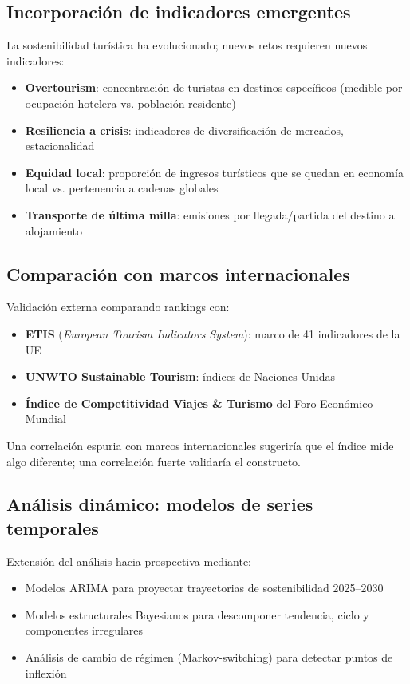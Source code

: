 \subsection{Incorporación de indicadores emergentes}

La sostenibilidad turística ha evolucionado; nuevos retos requieren nuevos indicadores:
\begin{itemize}
    \item \textbf{Overtourism}: concentración de turistas en destinos específicos (medible por ocupación hotelera vs. población residente)
    \item \textbf{Resiliencia a crisis}: indicadores de diversificación de mercados, estacionalidad
    \item \textbf{Equidad local}: proporción de ingresos turísticos que se quedan en economía local vs. pertenencia a cadenas globales
    \item \textbf{Transporte de última milla}: emisiones por llegada/partida del destino a alojamiento
\end{itemize}

\subsection{Comparación con marcos internacionales}

Validación externa comparando rankings con:
\begin{itemize}
    \item \textbf{ETIS} (\emph{European Tourism Indicators System}): marco de 41 indicadores de la UE
    \item \textbf{UNWTO Sustainable Tourism}: índices de Naciones Unidas
    \item \textbf{Índice de Competitividad Viajes \& Turismo} del Foro Económico Mundial
\end{itemize}

Una correlación espuria con marcos internacionales sugeriría que el índice mide algo diferente; una correlación fuerte validaría el constructo.

\subsection{Análisis dinámico: modelos de series temporales}

Extensión del análisis hacia prospectiva mediante:
\begin{itemize}
    \item Modelos ARIMA para proyectar trayectorias de sostenibilidad 2025--2030
    \item Modelos estructurales Bayesianos para descomponer tendencia, ciclo y componentes irregulares
    \item Análisis de cambio de régimen (Markov-switching) para detectar puntos de inflexión
\end{itemize}

